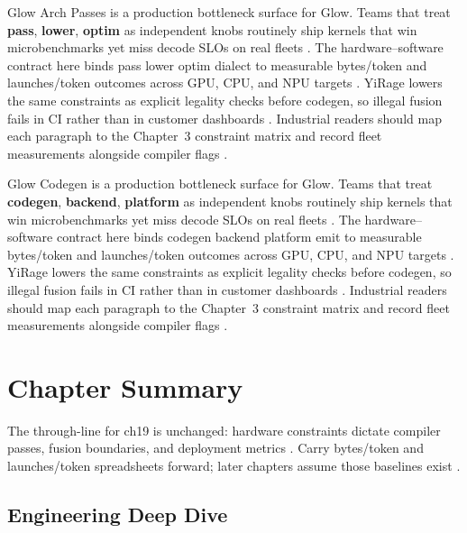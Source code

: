 Glow Arch Passes is a production bottleneck surface for Glow. Teams that treat \textbf{pass}, \textbf{lower}, \textbf{optim} as independent knobs routinely ship kernels that win microbenchmarks yet miss decode SLOs on real fleets \citep{nvidia2022hopper,amd2024aie}. The hardware--software contract here binds pass lower optim dialect to measurable bytes/token and launches/token outcomes across GPU, CPU, and NPU targets \citep{semianalysis2024tma,dlbook}. YiRage lowers the same constraints as explicit legality checks before codegen, so illegal fusion fails in CI rather than in customer dashboards \citep{amd2024xdna,dao2022flashattention}. Industrial readers should map each paragraph to the Chapter~3 constraint matrix and record fleet measurements alongside compiler flags \citep{amd2024aie,kwon2023vllm}.

Glow Codegen is a production bottleneck surface for Glow. Teams that treat \textbf{codegen}, \textbf{backend}, \textbf{platform} as independent knobs routinely ship kernels that win microbenchmarks yet miss decode SLOs on real fleets \citep{semianalysis2024tma,dlbook}. The hardware--software contract here binds codegen backend platform emit to measurable bytes/token and launches/token outcomes across GPU, CPU, and NPU targets \citep{amd2024xdna,dao2022flashattention}. YiRage lowers the same constraints as explicit legality checks before codegen, so illegal fusion fails in CI rather than in customer dashboards \citep{amd2024aie,kwon2023vllm}. Industrial readers should map each paragraph to the Chapter~3 constraint matrix and record fleet measurements alongside compiler flags \citep{dlbook,nvidia2024cudagraphs}.

\section{Chapter Summary}
\label{sec:ch19_summary}

The through-line for ch19 is unchanged: hardware constraints dictate compiler passes, fusion boundaries, and deployment metrics \citep{memoryfloor2026,amd2024xdna}. Carry bytes/token and launches/token spreadsheets forward; later chapters assume those baselines exist \citep{semianalysis2024tma,dlbook}.


\subsection{Engineering Deep Dive}
\label{sec:ch19_deep_dive}


